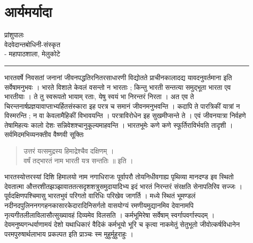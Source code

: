 \chapter{आर्यमर्यादा}

\begin{center}
\smallskip

प्रांशुपालः\\
वेदवेदान्तबोधिनी-संस्कृत\\
- महापाठशाला, मेलुकोटे
\rule{\textwidth}{0.1pt}
\end{center}

भारतवर्षे निवसतां जनानां जीवनपद्धतिरनितरसाधारणी विद्योतते प्राचीनकालादद्य यावदनुवर्तमाना इति सर्वेषामनुभवः । भारते विशाले केवलं वसन्तो न भारताः ; किन्तु भारती सन्तत्या समुद्भूता भारता एव भारतीयाः । ते तु स्वरूपतो भायाम् रताः, येषु स्वयं भा निरन्तरं निरता । अत एव ते चिरन्तनार्षप्रज्ञयावाप्ताभ्यर्हितसंस्कारा इह परत्र च समानं जीवनमनुभवन्ति । कदापि ते पारत्रिकीं यात्रां न विस्मरन्ति ; न वा केवलामैहिकीं विभावयन्ति । परत्राविरोधेन इह सुखमीप्सन्ते ते । एवं जीवनयात्रा निर्वहणे तेषामिहत्यः कालो देशः सन्निवेशश्चानुकूल्यमाहवन्ति । भारतभूमेः कणे कणे स्फूर्तिराविर्भवति तादृशी । सर्वमिदमभिव्यनक्तीव वैष्णवी सूक्तिः 
\begin{verse}
उत्तरं यत्समुद्रस्य हिमाद्रेश्चैव दक्षिणम् ।\\
वर्षं तद्भारतं नाम भारती यत्र सन्ततिः ॥ इति ।
\end{verse}
भारतस्योत्तरस्यां दिशि हिमालयो नाम नगाधिराजः पूर्वापरौ तोयनिधीवगाह्य पृथिव्या मानदण्ड इव स्थितो देवतात्मा औत्तरशीतझञ्झावाततत्सदृशशत्रुसमुदायादिभ्य इदं भारतं निरन्तरं संरक्षति सेनापतिरिव सज्जः । पूर्वदक्षिणपश्चिमासु भारतभुवं परिगतो वारिधिः परिखेव जागर्ति । मध्ये स्थितं  भूमण्डलं नदीनदपुलिननगगहनकासारकेदारादिनिसर्गतो वासयोग्यं रमणीयमुद्यानमिव देवानामपि नृत्यगीतलीलाविलासौत्सुख्यावहं दिव्यमेव विलसति । कर्मभूमिरेषा सर्वेषाम् स्वर्गापवर्गास्पदम् । देवमनुष्यगन्धर्वाणामयं देशो यथाधिकारं वैदिकं कर्मभूयो भूरि च कृत्वा नाकमेतुं सेतुभूतो जीवोत्कर्षविधानेन परमपुरुषार्थलाभाय प्रकल्पत इति प्राञ्चः स्म मुहुर्मुहुराहुः ।

